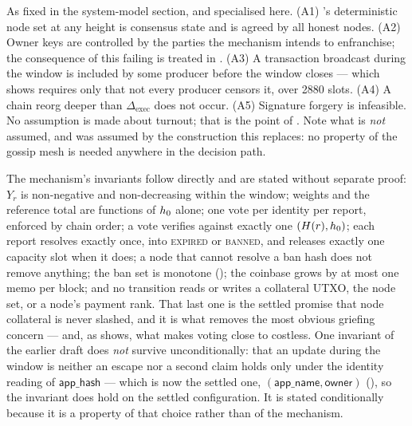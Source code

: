 \begin{assumption}
\label{ass:23:mechanism}
As fixed in the system-model section, and specialised here. (A1) \fluxd's deterministic node set at
any height is consensus state and is agreed by all honest nodes. (A2) Owner keys are controlled by
the parties the mechanism intends to enfranchise; the consequence of this failing is treated in
. (A3) A transaction broadcast during the window is included by some
producer before the window closes --- which  shows requires only that not
every producer censors it, over \num{2880} slots. (A4) A chain reorg deeper than
$\Delta_{\mathrm{exec}}$ does not occur. (A5) Signature forgery is infeasible. No assumption is made
about turnout; that is the point of . Note what is \emph{not} assumed, and was
assumed by the construction this replaces: no property of the \FluxOS{} gossip mesh is needed
anywhere in the decision path.
\end{assumption}

The mechanism's invariants follow directly and are stated without separate proof: $Y_r$ is
non-negative and non-decreasing within the window; weights and the reference total are functions of
$h_0$ alone; one vote per identity per report, enforced by chain order; a vote verifies against
exactly one $(H(r), h_0)$; each report resolves exactly once, into \textsc{expired} or
\textsc{banned}, and releases exactly one capacity slot when it does; a node that cannot resolve a
ban hash does not remove anything; the ban set is monotone (); the coinbase
grows by at most one memo per block; and no transition reads or writes a collateral UTXO, the node
set, or a node's payment rank. That last one is the settled promise that node collateral is never
slashed, and it is what removes the most obvious griefing concern — and, as 
shows, what makes voting close to costless. One invariant of the earlier draft does \emph{not}
survive unconditionally: that an update during the window is neither an escape nor a second claim
holds only under the identity reading of $\mathsf{app\_hash}$ --- which is now the settled one,
$(\mathsf{app\_name}, \mathsf{owner})$ (), so the invariant does hold on the
settled configuration. It is stated conditionally because it is a property of that choice rather than
of the mechanism.

